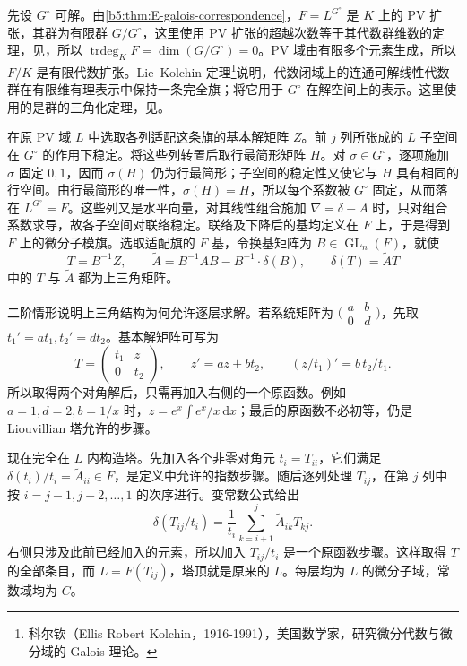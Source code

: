 \begin{proofsketch}
	先设 \(G^\circ\) 可解。由\cref{b5:thm:E-galois-correspondence}，\(F=L^{G^\circ}\) 是 \(K\) 上的 PV 扩张，其群为有限群 \(G/G^\circ\)，这里使用 PV 扩张的超越次数等于其代数群维数的定理，见\cite[Proposition 1.34(3)]{VanDerPutSinger2003GaloisTheory}，所以 \(\operatorname{trdeg}_K F=\dim(G/G^\circ)=0\)。PV 域由有限多个元素生成，所以 \(F/K\) 是有限代数扩张。Lie--Kolchin 定理\footnote{科尔钦（Ellis Robert Kolchin，1916-1991），美国数学家，研究微分代数与微分域的 Galois 理论。}说明，代数闭域上的连通可解线性代数群在有限维有理表示中保持一条完全旗；将它用于 \(G^\circ\) 在解空间上的表示。这里使用的是群的三角化定理，见\cite[Theorem 1.5.8, p. 44]{Singer2009DifferentialGalois}。

	在原 PV 域 \(L\) 中选取各列适配这条旗的基本解矩阵 \(Z\)。前 \(j\) 列所张成的 \(L\) 子空间在 \(G^\circ\) 的作用下稳定。将这些列转置后取行最简形矩阵 \(H\)。对 \(\sigma\in G^\circ\)，逐项施加 \(\sigma\) 固定 \(0,1\)，因而 \(\sigma(H)\) 仍为行最简形；子空间的稳定性又使它与 \(H\) 具有相同的行空间。由行最简形的唯一性，\(\sigma(H)=H\)，所以每个系数被 \(G^\circ\) 固定，从而落在 \(L^{G^\circ}=F\)。这些列又是水平向量，对其线性组合施加 \(\nabla=\delta-A\) 时，只对组合系数求导，故各子空间对联络稳定。联络及下降后的基均定义在 \(F\) 上，于是得到 \(F\) 上的微分子模旗。选取适配旗的 \(F\) 基，令换基矩阵为 \(B\in\operatorname{GL}_n(F)\)，就使
	\[
		T=B^{-1}Z,\qquad \widetilde A=B^{-1}AB-B^{-1}\cdot\delta(B),\qquad \delta(T)=\widetilde A T
	\]
	中的 \(T\) 与 \(\widetilde A\) 都为上三角矩阵。

	二阶情形说明上三角结构为何允许逐层求解。若系统矩阵为
	\(\bigl(\begin{smallmatrix}a&b\\0&d\end{smallmatrix}\bigr)\)，先取 \(t_1'=at_1,t_2'=dt_2\)。基本解矩阵可写为
	\[
		T=\begin{pmatrix}t_1&z\\0&t_2\end{pmatrix},
		\qquad z'=az+bt_2, \qquad (z/t_1)'=b\,t_2/t_1.
	\]
	所以取得两个对角解后，只需再加入右侧的一个原函数。例如 \(a=1,d=2,b=1/x\) 时，\(z=e^x\int e^x/x\,\mathrm dx\)；最后的原函数不必初等，仍是 Liouvillian 塔允许的步骤。

	现在完全在 \(L\) 内构造塔。先加入各个非零对角元 \(t_i=T_{ii}\)，它们满足 \(\delta(t_i)/t_i=\widetilde A_{ii}\in F\)，是定义中允许的指数步骤。随后逐列处理 \(T_{ij}\)，在第 \(j\) 列中按 \(i=j-1,j-2,\ldots,1\) 的次序进行。变常数公式给出
	\[
		\delta(T_{ij}/t_i) =\frac1{t_i}\sum_{k=i+1}^j\widetilde A_{ik}T_{kj}.
	\]
	右侧只涉及此前已经加入的元素，所以加入 \(T_{ij}/t_i\) 是一个原函数步骤。这样取得 \(T\) 的全部条目，而 \(L=F(T_{ij})\)，塔顶就是原来的 \(L\)。每层均为 \(L\) 的微分子域，常数域均为 \(C\)。


\end{proofsketch}
